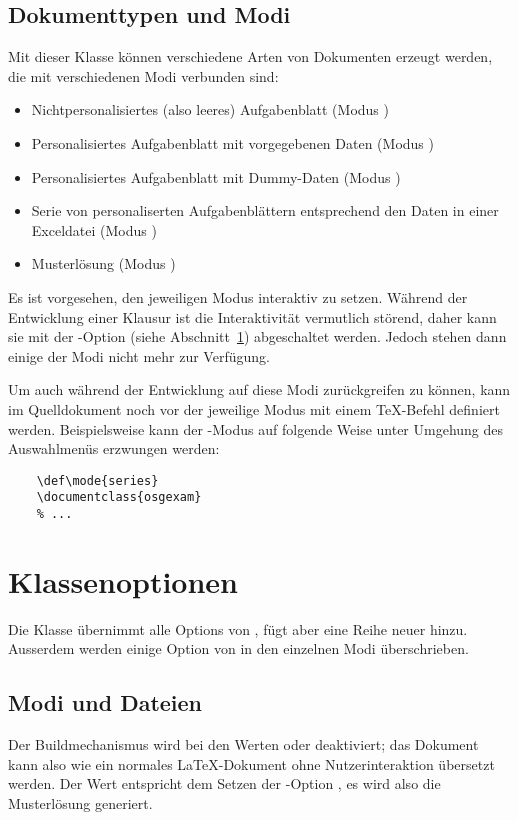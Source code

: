 \documentclass[
load=osgexam,
babel=ngerman
]{skdoc}
\begin{document}
\subsection{Dokumenttypen und Modi}
\label{sec:doctypes}
Mit dieser Klasse können verschiedene Arten von Dokumenten erzeugt werden, die mit verschiedenen Modi verbunden sind:
\begin{itemize}[nosep]
  \item Nichtpersonalisiertes (also leeres) Aufgabenblatt (Modus )
  \item Personalisiertes Aufgabenblatt mit vorgegebenen Daten (Modus )
  \item Personalisiertes Aufgabenblatt mit Dummy-Daten (Modus )
  \item Serie von personaliserten Aufgabenblättern entsprechend den Daten in einer Exceldatei (Modus )
  \item Musterlösung  (Modus )
\end{itemize}
Es ist vorgesehen, den jeweiligen Modus interaktiv zu setzen.
Während der Entwicklung einer Klausur ist die Interaktivität vermutlich störend, daher kann sie mit der
-Option (siehe Abschnitt~\ref{sec:options}) abgeschaltet werden. Jedoch stehen dann einige der Modi nicht mehr zur
Verfügung.

Um auch während der Entwicklung auf diese Modi zurückgreifen zu können, kann im Quelldokument noch vor
 der jeweilige Modus mit einem \TeX-Befehl definiert werden.
Beispielsweise kann der -Modus auf folgende Weise unter Umgehung des Auswahlmenüs erzwungen werden:
\begin{lstlisting}
    \def\mode{series}
    \documentclass{osgexam}
    % ...
\end{lstlisting}

\section{Klassenoptionen}
\label{sec:options}
Die Klasse übernimmt alle Options von , fügt aber eine Reihe neuer
hinzu. Ausserdem werden einige Option von  in den einzelnen Modi überschrieben.

\subsection*{Modi und Dateien}
Der Buildmechanismus wird bei den Werten  oder  deaktiviert; das Dokument kann also wie ein
normales \LaTeX-Dokument ohne Nutzerinteraktion übersetzt werden. Der Wert  entspricht dem Setzen der
-Option , es wird also die Musterlösung generiert.
\end{document}
